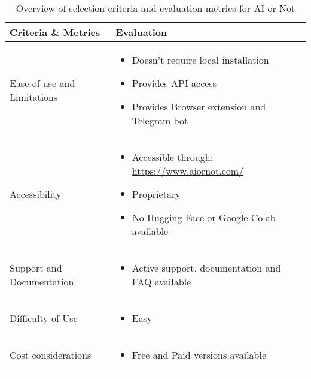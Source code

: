 \begin{table}[htpb]
	\caption{Overview of selection criteria and evaluation metrics for AI or Not}\label{tab:ai-or-not-overview}
	\centering
	\small
	\begin{tabularx}{\textwidth}{l X}
		\toprule
		\textbf{Criteria \& Metrics} & \textbf{Evaluation}                                                   \\
		\midrule
		Ease of use and Limitations  & \begin{itemize}[nosep,nolistsep,noitemsep]
			                               \item Doesn't require local installation
			                               \item Provides \ac{API} access
			                               \item Provides Browser extension and Telegram bot
		                               \end{itemize}                      \\
		Accessibility                & \begin{itemize}[nosep,nolistsep,noitemsep]
			                               \item Accessible through: \url{https://www.aiornot.com/}
			                               \item Proprietary
			                               \item No Hugging Face or Google Colab available
		                               \end{itemize}               \\
		Support and Documentation    & \begin{itemize}[nosep,nolistsep,noitemsep]
			                               \item Active support, documentation and FAQ available
		                               \end{itemize}                  \\
		Difficulty of Use            & \begin{itemize}[nosep,nolistsep,noitemsep]
			                               \item Easy
		                               \end{itemize}                             \\
		Cost considerations          & \begin{itemize}[nosep,nolistsep,noitemsep]
			                               \item Free and Paid versions available

\end{itemize}
\end{tabularx}
\end{table}
